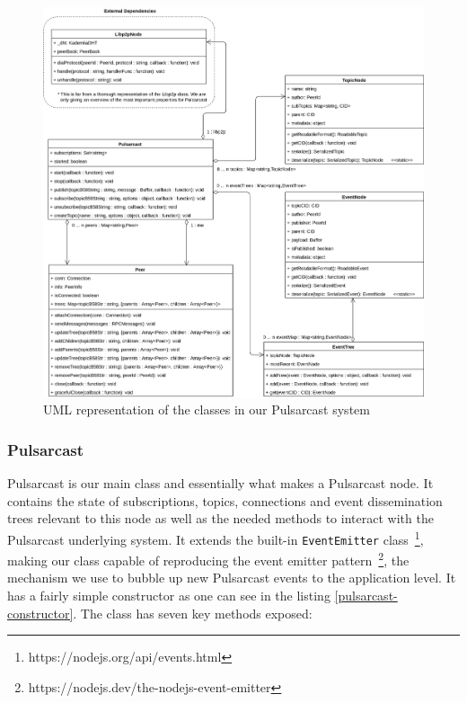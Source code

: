 \begin{figure}[hb!]
  \center
  \includegraphics[width=1\textwidth]{img/uml-pulsarcast.png}
  \caption{UML representation of the classes in our Pulsarcast system}
  \label{fig:pulsarcast-uml}
\end{figure}

\subsubsection{Pulsarcast}\label{subsubsec:pulsarcast}

Pulsarcast is our main class and essentially what makes a Pulsarcast node. It
contains the state of subscriptions, topics, connections and event
dissemination trees relevant to this node as well as the needed methods to
interact with the Pulsarcast underlying system. It extends the built-in
\verb|EventEmitter| class~\footnote{https://nodejs.org/api/events.html}, making
our class capable of reproducing the event emitter
pattern~\footnote{https://nodejs.dev/the-nodejs-event-emitter}, the mechanism
we use to bubble up new Pulsarcast events to the application level. It has a
fairly simple constructor as one can see in the listing
\ref{pulsarcast-constructor}. The class has seven key methods exposed:

